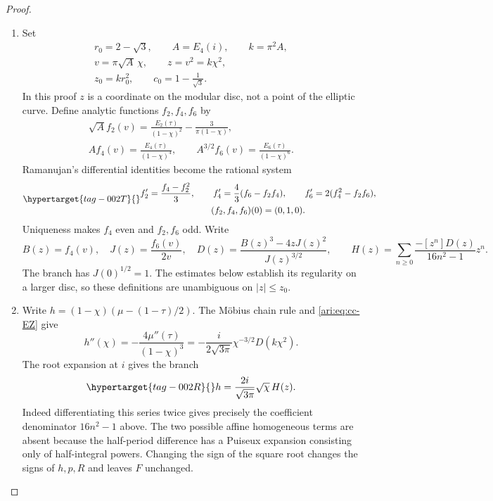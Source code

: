 \begin{proof}
\begin{enumerate}[label=\arabic*.,leftmargin=*]
\item Set
\[
 \begin{gathered}
 r_0=2-\sqrt3,\qquad A=E_4(i),\qquad k=\pi^2A,\\
 v=\pi\sqrt A\,\chi,\qquad z=v^2=k\chi^2,\\
 z_0=kr_0^2,\qquad c_0=1-\frac1{\sqrt3}.
 \end{gathered}
\]
In this proof $z$ is a coordinate on the modular disc, not a
point of the elliptic curve. Define analytic functions $f_2,f_4,f_6$
by
\[
 \begin{gathered}
 \sqrt A f_2(v)=\frac{E_2(\tau)}{(1-\chi)^2}
                         -\frac3{\pi(1-\chi)},\\
 A f_4(v)=\frac{E_4(\tau)}{(1-\chi)^4},\qquad
 A^{3/2} f_6(v)=\frac{E_6(\tau)}{(1-\chi)^6}.
 \end{gathered}
\]
Ramanujan's differential identities become the rational system
\begin{equation}\hypertarget{tag-002T}{}\label{ari:eq:cc-ode}
 \begin{gathered}
 f_2'=\frac{f_4-f_2^2}{3},\qquad
 f_4'=\frac43(f_6-f_2f_4),\qquad
 f_6'=2(f_4^2-f_2f_6),\\
 (f_2,f_4,f_6)(0)=(0,1,0).
 \end{gathered}
\end{equation}
Uniqueness makes $f_4$ even and $f_2,f_6$ odd. Write
\[
 B(z)=f_4(v),\quad J(z)=\frac{f_6(v)}{2v},\quad
 D(z)=\frac{B(z)^3-4zJ(z)^2}{J(z)^{3/2}},\qquad
 H(z)=\sum_{n\ge0}\frac{-[z^n]D(z)}{16n^2-1}z^n.
\]
The branch has $J(0)^{1/2}=1$. The estimates below establish
its regularity on a larger disc, so these definitions are
unambiguous on $|z|\le z_0$.

\item Write $h=(1-\chi)(\mu-(1-\tau)/2)$. The Möbius chain rule and
\eqref{ari:eq:cc-EZ} give
\[
 h''(\chi)=-\frac{4\mu''(\tau)}{(1-\chi)^3}
       =-\frac{i}{2\sqrt{3\pi}}\chi^{-3/2}D(k\chi^2).
\]
The root expansion at $i$ gives the branch
\begin{equation}\hypertarget{tag-002R}{}\label{ari:eq:cc-h}
 h=\frac{2i}{\sqrt{3\pi}}\sqrt \chi\,H(z).
\end{equation}
Indeed differentiating this series twice gives precisely the
coefficient denominator $16n^2-1$ above. The two possible affine
homogeneous terms are absent because the half-period difference
has a Puiseux expansion consisting only of half-integral powers.
Changing the sign of the square root changes the signs of $h,p,R$
and leaves $F$ unchanged.


\end{enumerate}
\end{proof}
